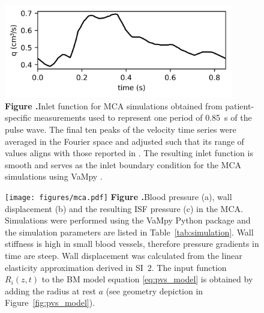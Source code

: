 \documentclass{frontiersFPHY} %
\begin{document}
\begin{figure}[h!]
\centering
\includegraphics[width=10cm]{figures/inlet.png}
\textbf{\label{fig:inlet} Figure .}{Inlet function for MCA simulations obtained from patient-specific measurements used to represent one period of \SI{0.85}{\second} of the pulse wave. The final ten peaks of the velocity time series were averaged in the Fourier space and adjusted such that its range of values aligns with those reported in \cite{Olufsen2002}. The resulting inlet function is smooth and serves as the inlet boundary condition for the MCA simulations using VaMpy \cite{Diem2016a}.}
\end{figure}

\begin{figure}[h!]
\centering
\texttt{[image: figures/mca.pdf]}
\textbf{\label{fig:mca} Figure .}{Blood pressure (a), wall displacement (b) and the resulting ISF pressure (c) in the MCA. Simulations were performed using the VaMpy Python package \cite{Diem2016a} and the simulation parameters are listed in Table~\ref{tab:simulation}. Wall stiffness is high in small blood vessels, therefore pressure gradients in time are steep. Wall displacement was calculated from the linear elasticity approximation derived in SI~2. The input function $R_i(z,t)$ to the BM model equation \eqref{eq:pvs_model} is obtained by adding the radius at rest $a$ (see geometry depiction in Figure~\ref{fig:pvs_model}).}
\end{figure}
\end{document}
